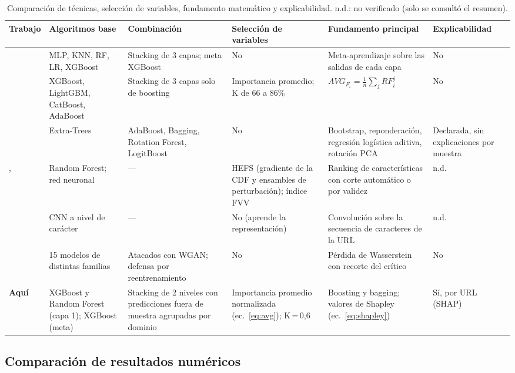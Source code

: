 \begin{table}[t]
\caption{Comparación de técnicas, selección de variables, fundamento matemático y explicabilidad. n.d.: no verificado (solo se consultó el resumen).}
\label{tab:tecnicas}
\centering
\footnotesize
\renewcommand{\arraystretch}{1.15}
\setlength{\tabcolsep}{4pt}
\begin{tabular}{p{1.3cm} p{2.7cm} p{3.0cm} p{2.5cm} p{3.6cm} p{2.3cm}}
\hline
\textbf{Trabajo} & \textbf{Algoritmos base} & \textbf{Combinación} & \textbf{Selección de variables} & \textbf{Fundamento principal} & \textbf{Explicabilidad}\\
\hline
\cite{kalabarige2022multilayer} & MLP, KNN, RF, LR, XGBoost & Stacking de 3 capas; meta XGBoost & No & Meta-aprendizaje sobre las salidas de cada capa & No\\
\cite{kalabarige2023boosting} & XGBoost, LightGBM, CatBoost, AdaBoost & Stacking de 3 capas solo de boosting & Importancia promedio; K de 66 a 86\% & $AVG_{F_i}=\frac{1}{n}\sum_j RF_i^j$ & No\\
\cite{alsariera2020ai} & Extra-Trees & AdaBoost, Bagging, Rotation Forest, LogitBoost & No & Bootstrap, reponderación, regresión logística aditiva, rotación PCA & Declarada, sin explicaciones por muestra\\
\cite{chiew2019hybrid}, \cite{zhu2019ofsnn} & Random Forest; red neuronal & --- & HEFS (gradiente de la CDF y ensambles de perturbación); índice FVV & Ranking de características con corte automático o por validez & n.d.\\
\cite{aljofey2020effective} & CNN a nivel de carácter & --- & No (aprende la representación) & Convolución sobre la secuencia de caracteres de la URL & n.d.\\
\cite{duy2024study} & 15 modelos de distintas familias & Atacados con WGAN; defensa por reentrenamiento & No & Pérdida de Wasserstein con recorte del crítico & No\\
\hline
\textbf{Aquí} & XGBoost y Random Forest (capa 1); XGBoost (meta) & Stacking de 2 niveles con predicciones fuera de muestra agrupadas por dominio & Importancia promedio normalizada (ec.~\ref{eq:avg}); K\,=\,0,6 & Boosting y bagging; valores de Shapley (ec.~\ref{eq:shapley}) & Sí, por URL (SHAP)\\
\hline
\end{tabular}
\end{table}

\subsection{Comparación de resultados numéricos}

